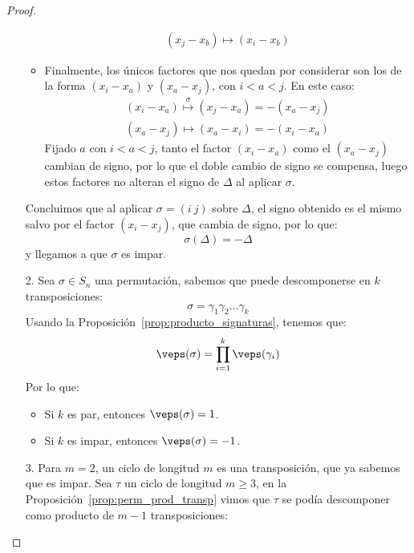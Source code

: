 \begin{prop}
\begin{proof}
\begin{enumerate}
\begin{itemize}
\begin{align*}
                            (x_j - x_b) \longmapsto (x_i - x_b) 
                        \end{align*}
                    \item Finalmente, los únicos factores que nos quedan por considerar son los de la forma $(x_i - x_a)$ y $(x_a - x_j)$, con $i < a < j$. En este caso:
                        \begin{align*}
                            (x_i - x_a) \stackrel{\sigma}{\longmapsto} (x_j - x_a) = -(x_a - x_j) \\
                            (x_a - x_j) \longmapsto (x_a - x_i) = -(x_i - x_a) 
                        \end{align*}
                        Fijado $a$ con $i<a<j$, tanto el factor $(x_i - x_a)$ como el $(x_a - x_j)$ cambian de signo, por lo que el doble cambio de signo se compensa, luego estos factores no alteran el signo de $\Delta$ al aplicar $\sigma$.
                \end{itemize}
                Concluimos que al aplicar $\sigma = (i\ j)$ sobre $\Delta$, el signo obtenido es el mismo salvo por el factor $(x_i - x_j)$, que cambia de signo, por lo que:
                \begin{equation*}
                    \sigma(\Delta) = -\Delta
                \end{equation*}
                y llegamos a que $\sigma$ es impar.
            \item[2.] Sea $\sigma\in S_n$ una permutación, sabemos que puede descomponerse en $k$ transposiciones:
                \begin{equation*}
                    \sigma = \gamma_1\gamma_2\ldots\gamma_k
                \end{equation*}
                Usando la Proposición~\ref{prop:producto_signaturas}, tenemos que:
                \begin{equation*}
                    \veps(\sigma) = \prod_{i=1}^{k}\veps(\gamma_i)
                \end{equation*}
                Por lo que:
                \begin{itemize}
                    \item Si $k$ es par, entonces $\veps(\sigma)=1$.
                    \item Si $k$ es impar, entonces $\veps(\sigma)=-1$.
                \end{itemize}
            \item[3.] Para $m=2$, un ciclo de longitud $m$ es una transposición, que ya sabemos que es impar. Sea $\tau$ un ciclo de longitud $m\geq 3$, en la Proposición~\ref{prop:perm_prod_transp} vimos que $\tau$ se podía descomponer como producto de $m-1$ transposiciones:

\end{enumerate}
\end{proof}
\end{prop}
